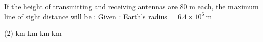 \item If the height of transmitting and receiving antennas are 80 m each, the maximum line of sight distance will be : 
Given : Earth's radius = $6.4 \times 10^6  \, \text{m}$
         \begin{tasks}(2)
              km
              km
              km
              km
         \end{tasks}